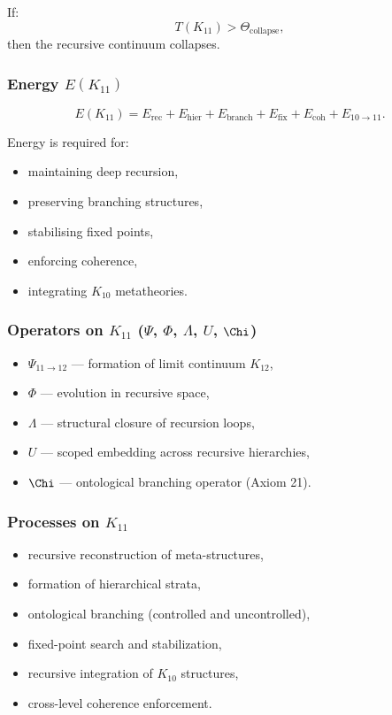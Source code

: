 If:
\[
T(K_{11}) > \Theta_{\mathrm{collapse}},
\]
then the recursive continuum collapses.

\subsubsection{Energy $E(K_{11})$}

\[
E(K_{11})=
E_{\mathrm{rec}}+
E_{\mathrm{hier}}+
E_{\mathrm{branch}}+
E_{\mathrm{fix}}+
E_{\mathrm{coh}}+
E_{10\to11}.
\]

Energy is required for:
\begin{itemize}
    \item maintaining deep recursion,
    \item preserving branching structures,
    \item stabilising fixed points,
    \item enforcing coherence,
    \item integrating $K_{10}$ metatheories.
\end{itemize}

\subsubsection{Operators on $K_{11}$ ($\Psi$, $\Phi$, $\Lambda$, $U$, $\Chi$)}

\begin{itemize}
    \item $\Psi_{11\to12}$ — formation of limit continuum $K_{12}$,
    \item $\Phi$ — evolution in recursive space,
    \item $\Lambda$ — structural closure of recursion loops,
    \item $U$ — scoped embedding across recursive hierarchies,
    \item $\Chi$ — ontological branching operator (Axiom 21).
\end{itemize}

\subsubsection{Processes on $K_{11}$}

\begin{itemize}
    \item recursive reconstruction of meta-structures,
    \item formation of hierarchical strata,
    \item ontological branching (controlled and uncontrolled),
    \item fixed-point search and stabilization,
    \item recursive integration of $K_{10}$ structures,
    \item cross-level coherence enforcement.
\end{itemize}

